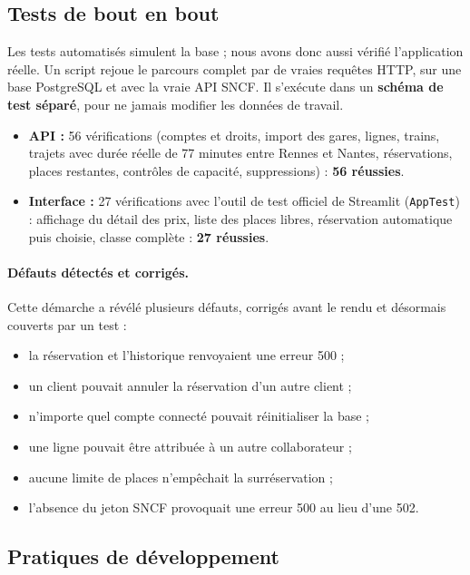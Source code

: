 \documentclass[11pt,a4paper]{article}
\newcommand{\code}[1]{\texttt{#1}}
\begin{document}
\subsection{Tests de bout en bout}

Les tests automatisés simulent la base ; nous avons donc aussi vérifié l'application réelle. Un
script rejoue le parcours complet par de vraies requêtes HTTP, sur une base PostgreSQL et avec la
vraie API SNCF. Il s'exécute dans un \textbf{schéma de test séparé}, pour ne jamais modifier les
données de travail.

\begin{itemize}[nosep]
  \item \textbf{API :} 56 vérifications (comptes et droits, import des gares, lignes, trains,
        trajets avec durée réelle de 77 minutes entre Rennes et Nantes, réservations, places
        restantes, contrôles de capacité, suppressions) : \textbf{56 réussies}.
  \item \textbf{Interface :} 27 vérifications avec l'outil de test officiel de Streamlit
        (\code{AppTest}) : affichage du détail des prix, liste des places libres, réservation
        automatique puis choisie, classe complète : \textbf{27 réussies}.
\end{itemize}

\paragraph{Défauts détectés et corrigés.}
Cette démarche a révélé plusieurs défauts, corrigés avant le rendu et désormais couverts par un test :
\begin{itemize}[nosep]
  \item la réservation et l'historique renvoyaient une erreur 500 ;
  \item un client pouvait annuler la réservation d'un autre client ;
  \item n'importe quel compte connecté pouvait réinitialiser la base ;
  \item une ligne pouvait être attribuée à un autre collaborateur ;
  \item aucune limite de places n'empêchait la surréservation ;
  \item l'absence du jeton SNCF provoquait une erreur 500 au lieu d'une 502.
\end{itemize}

\subsection{Pratiques de développement}
\end{document}

